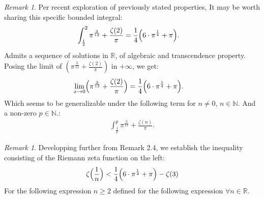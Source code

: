 \documentclass[10pt]{article}
\theoremstyle{plain}
\theoremstyle{definition}
\theoremstyle{remark}
\newtheorem{remark}[theorem]{Remark}
\begin{document}
\begin{remark}
	Per recent exploration of previously stated properties, It may be worth sharing this specific bounded integral:
	\begin{align*}
		\int_{\frac{1}{2}}^{2} \pi^{\frac{3}{12}} + \frac{\zeta(2)}{\pi} &= \frac{1}{4} \Bigl(6 \cdot \pi^{\frac{1}{4}} + \pi\Bigr).
	\end{align*}
	Admits a sequence of solutions in $\mathbb{R}$, of algebraic and transcendence property. Posing the limit of $(\pi^{\frac{3}{12}} + \frac{\zeta(2)}{\pi})$ in $+\infty$, we get:
	\begin{align*}
	\lim_{x \to 0} \Bigl(\pi^{\frac{3}{12}} + \frac{\zeta(2)}{\pi}\Bigr) &= \frac{1}{4} \Bigl(6 \cdot \pi^{\frac{1}{4}} + \pi\Bigr).
	\end{align*}
	Which seems to be generalizable under the following term for $n \neq 0, \, n \in \mathbb{N}.$ And a non-zero $p \in \mathbb{N}.$:
	\begin{align*}
		\int_{\frac{1}{p}}^{p} \pi^{\frac{3}{12}} + \frac{\zeta(n)}{\pi}.
	\end{align*}
\end{remark}

\begin{remark}
	Developping further from Remark 2.4, we establish the inequality consisting of the Riemann zeta function on the left:
	\begin{align*}
		\zeta\Bigl(\frac{1}{n}\Bigr) < \frac{1}{4}\Bigl(6 \cdot \pi^{\frac{1}{4}} + \pi\Bigr) - \zeta(3)
	\end{align*}
	For the following expression $n \geq 2$ defined for the following expression $\forall n \in \mathbb{R}$.
\end{remark}
\end{document}
